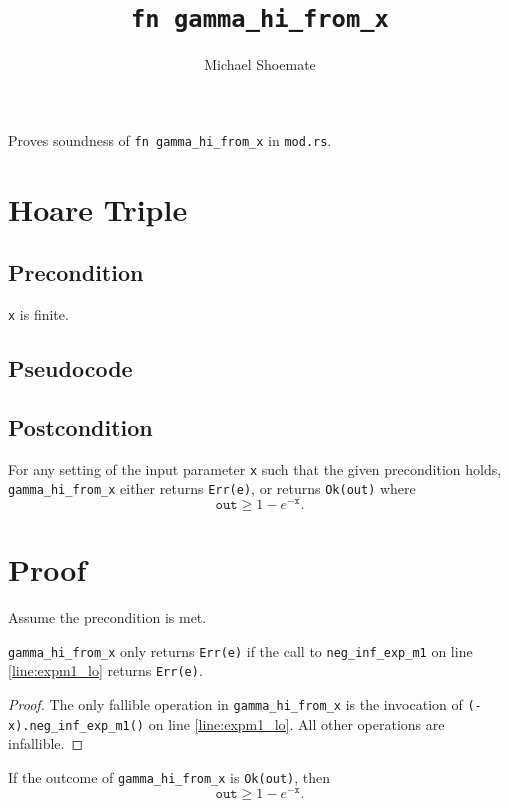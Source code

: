 \documentclass{article}
\title{\texttt{fn gamma\_hi\_from\_x}}
\author{Michael Shoemate}
\begin{document}
\maketitle

Proves soundness of \texttt{fn gamma\_hi\_from\_x} in \texttt{mod.rs}.

\section{Hoare Triple}
\subsection*{Precondition}
\texttt{x} is finite.

\subsection*{Pseudocode}


\subsection*{Postcondition}
\begin{theorem}
\label{postcondition}
For any setting of the input parameter \texttt{x} such that the given precondition holds,
\texttt{gamma\_hi\_from\_x} either returns \texttt{Err(e)},
or returns \texttt{Ok(out)} where
\[
\texttt{out} \ge 1 - e^{-\texttt{x}}.
\]
\end{theorem}

\section{Proof}
Assume the precondition is met.

\begin{lemma}
\label{err-e}
\texttt{gamma\_hi\_from\_x} only returns \texttt{Err(e)} if the call to
\texttt{neg\_inf\_exp\_m1} on line \ref{line:expm1_lo} returns \texttt{Err(e)}.
\end{lemma}

\begin{proof}
The only fallible operation in \texttt{gamma\_hi\_from\_x} is the invocation of
\texttt{(-x).neg\_inf\_exp\_m1()} on line \ref{line:expm1_lo}.
All other operations are infallible.
\end{proof}

\begin{lemma}
\label{ok-out}
If the outcome of \texttt{gamma\_hi\_from\_x} is \texttt{Ok(out)}, then
\[
\texttt{out} \ge 1 - e^{-\texttt{x}}.
\]
\end{lemma}
\end{document}
